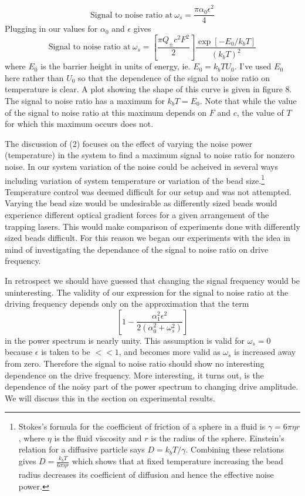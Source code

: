 \documentclass{report}
\begin{document}
\begin{displaymath}
\textrm{Signal to noise ratio at}~\omega_s = \frac{\pi \alpha_0 \epsilon^2}{4}
\end{displaymath}
Plugging in our values for $\alpha_0$ and $\epsilon$ gives
\begin{displaymath}
\textrm{Signal to noise ratio at}~\omega_s = \left[\frac{\pi Q_{\pm}c^2F^2}{2}\right]
\frac{\exp\left[-E_0/k_bT\right]}{(k_bT)^2}
\end{displaymath}
where $E_0$ is the barrier height in units of energy, ie. $E_0=k_bTU_0$. I've used $E_0$ here rather than $U_0$ so that the dependence of the signal to noise ratio on temperature is clear. A plot showing the shape of this curve is given in figure 8. The signal to noise ratio has a maximum for $k_bT=E_0$. Note that while the value of the signal to noise ratio at this maximum depends on $F$ and $c$, the value of $T$ for which this maximum occurs does not.

The discussion of (2) focuses on the effect of varying the noise power (temperature) in the system to find a maximum signal to noise ratio for nonzero noise. In our system variation of the noise could be acheived in several ways including variation of system temperature or variation of the bead size.\footnote{Stokes's formula for the coefficient of friction of a sphere in a fluid is $\gamma = 6 \pi \eta r$, where $\eta$ is the fluid viscosity and $r$ is the radius of the sphere. Einstein's relation for a diffusive particle says $D=k_bT/\gamma$. Combining these relations gives $D=\frac{k_bT}{6\pi\eta r}$ which shows that at fixed temperature increasing the bead radius decreases its coefficient of diffusion and hence the effective noise power.} Temperature control was deemed difficult for our setup and was not attempted. Varying the bead size would be undesirable as differently sized beads would experience different optical gradient forces for a given arrangement of the trapping lasers. This would make comparison of experiments done with differently sized beads difficult. For this reason we began our experiments with the idea in mind of investigating the dependance of the signal to noise ratio on drive frequency.

In retrospect we should have guessed that changing the signal frequency would be uninteresting. The validity of our expression for the signal to noise ratio at the driving frequency depends only on the approximation that the term
\begin{displaymath}
\left[ 1-\frac{\alpha_1^2\epsilon^2}{2(\alpha_0^2+\omega_s^2)}\right]
\end{displaymath}
in the power spectrum is nearly unity. This assumption is valid for $\omega_s = 0$ because $\epsilon$ is taken to be $<<1$, and becomes more valid as $\omega_s$ is increased away from zero. Therefore the signal to noise ratio should show no interesting dependence on the drive frequency. More interesting, it turns out, is the dependence of the noisy part of the power spectrum to changing drive amplitude. We will discuss this in the section on experimental results.
\end{document}
